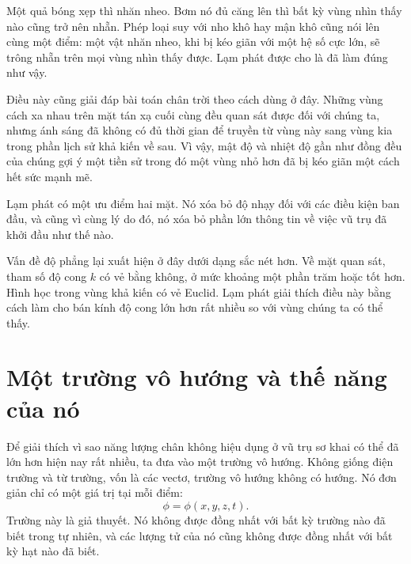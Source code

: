 Một quả bóng xẹp thì nhăn nheo. Bơm nó đủ căng lên thì bất kỳ vùng nhìn thấy nào cũng trở nên nhẵn. Phép loại suy với nho khô hay mận khô cũng nói lên cùng một điểm: một vật nhăn nheo, khi bị kéo giãn với một hệ số cực lớn, sẽ trông nhẵn trên mọi vùng nhìn thấy được. Lạm phát được cho là đã làm đúng như vậy.

Điều này cũng giải đáp bài toán chân trời theo cách dùng ở đây. Những vùng cách xa nhau trên mặt tán xạ cuối cùng đều quan sát được đối với chúng ta, nhưng ánh sáng đã không có đủ thời gian để truyền từ vùng này sang vùng kia trong phần lịch sử khả kiến về sau. Vì vậy, mật độ và nhiệt độ gần như đồng đều của chúng gợi ý một tiền sử trong đó một vùng nhỏ hơn đã bị kéo giãn một cách hết sức mạnh mẽ.

Lạm phát có một ưu điểm hai mặt. Nó xóa bỏ độ nhạy đối với các điều kiện ban đầu, và cũng vì cùng lý do đó, nó xóa bỏ phần lớn thông tin về việc vũ trụ đã khởi đầu như thế nào.

Vấn đề độ phẳng lại xuất hiện ở đây dưới dạng sắc nét hơn. Về mặt quan sát, tham số độ cong \(k\) có vẻ bằng không, ở mức khoảng một phần trăm hoặc tốt hơn. Hình học trong vùng khả kiến có vẻ Euclid. Lạm phát giải thích điều này bằng cách làm cho bán kính độ cong lớn hơn rất nhiều so với vùng chúng ta có thể thấy.

\begin{classroomqa}
\end{classroomqa}

\section{Một trường vô hướng và thế năng của nó}

Để giải thích vì sao năng lượng chân không hiệu dụng ở vũ trụ sơ khai có thể đã lớn hơn hiện nay rất nhiều, ta đưa vào một trường vô hướng. Không giống điện trường và từ trường, vốn là các vectơ, trường vô hướng không có hướng. Nó đơn giản chỉ có một giá trị tại mỗi điểm:
\begin{equation}
\phi=\phi(x,y,z,t).
\end{equation}
Trường này là giả thuyết. Nó không được đồng nhất với bất kỳ trường nào đã biết trong tự nhiên, và các lượng tử của nó cũng không được đồng nhất với bất kỳ hạt nào đã biết.

